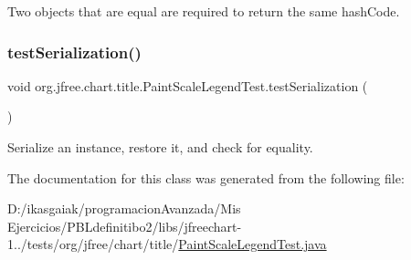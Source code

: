 Two objects that are equal are required to return the same hash\+Code. \mbox{\label{classorg_1_1jfree_1_1chart_1_1title_1_1_paint_scale_legend_test_a7c7ec8f77ce9edd08ad03bda989d5733}} 
\subsubsection{\texorpdfstring{test\+Serialization()}{testSerialization()}}
{\footnotesize\ttfamily void org.\+jfree.\+chart.\+title.\+Paint\+Scale\+Legend\+Test.\+test\+Serialization (\begin{DoxyParamCaption}{ }\end{DoxyParamCaption})}

Serialize an instance, restore it, and check for equality. 

The documentation for this class was generated from the following file\+:\begin{DoxyCompactItemize}
\item 
D\+:/ikasgaiak/programacion\+Avanzada/\+Mis Ejercicios/\+P\+B\+Ldefinitibo2/libs/jfreechart-\/1../tests/org/jfree/chart/title/\mbox{\hyperlink{_paint_scale_legend_test_8java}{Paint\+Scale\+Legend\+Test.\+java}}\end{DoxyCompactItemize}
